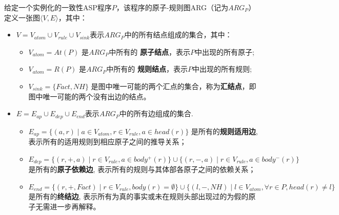 \begin{definition}[原子-规则图ARG]
    给定一个实例化的一致性ASP程序$P$，该程序的原子-规则图ARG（记为$ARG_P$）定义一张图$\langle V, E \rangle $，其中：
    \begin{itemize}[topsep=0pt]
      \setlength\itemsep{-0.3em}
      \item $V=V_{atom} \cup V_{rule} \cup V_{sink}$表示$ARG_P$中的所有结点组成的集合，其中：
      \begin{itemize}[label=$\circ$,topsep=0pt]
        \setlength\itemsep{-0.3em}
        \item $V_{atom} = At(P)$ 是$ARG_P$中所有的 \textbf{原子结点}，表示$P$中出现的所有原子;
        \item $V_{atom} = R(P)$ 是$ARG_P$中所有的 \textbf{规则结点}，表示$P$中出现的所有规则;
        \item $V_{sink} = \{Fact, NH\}$ 是图中唯一可能的两个汇点的集合，称为\textbf{汇结点}，即图中唯一可能的两个没有出边的结点。
      \end{itemize}
      \item $E=E_{ap} \cup E_{dep} \cup E_{end}$表示$ARG_P$中的所有边组成的集合.
      \begin{itemize}[label=$\circ$,topsep=0pt]
        \setlength\itemsep{-0.3em}
        \item $E_{ap} = \{(a, r) \mid a \in V_{atom}, r \in V_{rule}, a \in head(r) \}$ 是所有的\textbf{规则适用边}, 表示所有的适用规则到相应原子之间的推导关系；
        \item $E_{dep} = \{(r, +, a) \mid r \in V_{rule}, a \in body^+(r) \} \cup \{(r, -, a) \mid r \in V_{rule}, a \in body^-(r) \}$ 是所有的\textbf{原子依赖边}, 表示所有的规则与其体部各原子之间的依赖关系；
        \item $E_{end}=\{(r, +, Fact) \mid r \in V_{rule}, body(r)=\emptyset\} \cup \{(l, -, NH) \mid l \in V_{atom}, \forall r \in P, head(r) \neq l\}$是所有的\textbf{终结边}, 表示所有为真的事实或未在规则头部出现过的为假的原子无需进一步再解释。
      \end{itemize}
    \end{itemize}
\end{definition}

